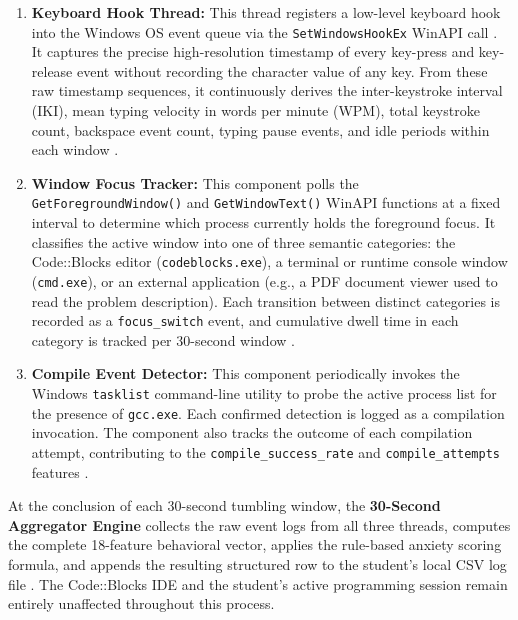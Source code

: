 \begin{enumerate}
    \item \textbf{Keyboard Hook Thread:} This thread registers a low-level keyboard hook into the Windows OS event queue via the \texttt{SetWindowsHookEx} WinAPI call \cite{zhang2023keystroke}. It captures the precise high-resolution timestamp of every key-press and key-release event without recording the character value of any key. From these raw timestamp sequences, it continuously derives the inter-keystroke interval (IKI), mean typing velocity in words per minute (WPM), total keystroke count, backspace event count, typing pause events, and idle periods within each window \cite{epp2015emotion, bunia2024keystroke}.

    \item \textbf{Window Focus Tracker:} This component polls the \texttt{GetForegroundWindow()} and \texttt{GetWindowText()} WinAPI functions at a fixed interval to determine which process currently holds the foreground focus. It classifies the active window into one of three semantic categories: the Code::Blocks editor (\texttt{codeblocks.exe}), a terminal or runtime console window (\texttt{cmd.exe}), or an external application (e.g., a PDF document viewer used to read the problem description). Each transition between distinct categories is recorded as a \texttt{focus\_switch} event, and cumulative dwell time in each category is tracked per 30-second window \cite{acm3507696}.

    \item \textbf{Compile Event Detector:} This component periodically invokes the Windows \texttt{tasklist} command-line utility to probe the active process list for the presence of \texttt{gcc.exe}. Each confirmed detection is logged as a compilation invocation. The component also tracks the outcome of each compilation attempt, contributing to the \texttt{compile\_success\_rate} and \texttt{compile\_attempts} features \cite{mdpi5739}.
\end{enumerate}

\noindent At the conclusion of each 30-second tumbling window, the \textbf{30-Second Aggregator Engine} collects the raw event logs from all three threads, computes the complete 18-feature behavioral vector, applies the rule-based anxiety scoring formula, and appends the resulting structured row to the student's local CSV log file \cite{keystroke2023}. The Code::Blocks IDE and the student's active programming session remain entirely unaffected throughout this process.


